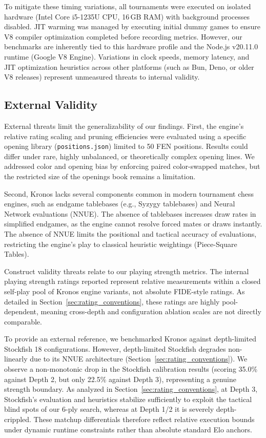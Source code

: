 To mitigate these timing variations, all tournaments were executed on isolated hardware (Intel Core i5-1235U CPU, 16\,GB RAM) with background processes disabled. JIT warming was managed by executing initial dummy games to ensure V8 compiler optimization completed before recording metrics. However, our benchmarks are inherently tied to this hardware profile and the Node.js v20.11.0 runtime (Google V8 Engine). Variations in clock speeds, memory latency, and JIT optimization heuristics across other platforms (such as Bun, Deno, or older V8 releases) represent unmeasured threats to internal validity.

\subsection{External Validity}
External threats limit the generalizability of our findings. First, the engine's relative rating scaling and pruning efficiencies were evaluated using a specific opening library (\texttt{positions.json}) limited to 50 FEN positions. Results could differ under rare, highly unbalanced, or theoretically complex opening lines. We addressed color and opening bias by enforcing paired color-swapped matches, but the restricted size of the openings book remains a limitation.

Second, Kronos lacks several components common in modern tournament chess engines, such as endgame tablebases (e.g., Syzygy tablebases) and Neural Network evaluations (NNUE). The absence of tablebases increases draw rates in simplified endgames, as the engine cannot resolve forced mates or draws instantly. The absence of NNUE limits the positional and tactical accuracy of evaluations, restricting the engine's play to classical heuristic weightings (Piece-Square Tables).

Construct validity threats relate to our playing strength metrics. The internal playing strength ratings reported represent relative measurements within a closed self-play pool of Kronos engine variants, not absolute FIDE-style ratings. As detailed in Section~\ref{sec:rating_conventions}, these ratings are highly pool-dependent, meaning cross-depth and configuration ablation scales are not directly comparable. 

To provide an external reference, we benchmarked Kronos against depth-limited Stockfish 18 configurations. However, depth-limited Stockfish degrades non-linearly due to its NNUE architecture (Section~\ref{sec:rating_conventions}). We observe a non-monotonic drop in the Stockfish calibration results (scoring 35.0\% against Depth 2, but only 22.5\% against Depth 3), representing a genuine strength boundary. As analyzed in Section~\ref{sec:rating_conventions}, at Depth 3, Stockfish's evaluation and heuristics stabilize sufficiently to exploit the tactical blind spots of our 6-ply search, whereas at Depth 1/2 it is severely depth-crippled. These matchup differentials therefore reflect relative execution bounds under dynamic runtime constraints rather than absolute standard Elo anchors.

